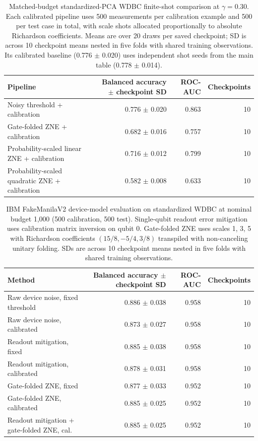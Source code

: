 \documentclass[conference]{IEEEtran}
\begin{document}
\begin{table}[t]\centering\small
\caption{Matched-budget standardized-PCA WDBC finite-shot comparison at $\gamma=0.30$. Each calibrated pipeline uses 500 measurements per calibration example and 500 per test case in total, with scale shots allocated proportionally to absolute Richardson coefficients. Means are over 20 draws per saved checkpoint; SD is across 10 checkpoint means nested in five folds with shared training observations. Its calibrated baseline (0.776 $\pm$ 0.020) uses independent shot seeds from the main table (0.778 $\pm$ 0.014).}
\label{tab:primary-gatefold}
\begin{tabular}{@{}l r r r@{}}\toprule
Pipeline & Balanced accuracy $\pm$ checkpoint SD & ROC-AUC & Checkpoints \\ \midrule
Noisy threshold + calibration & 0.776 $\pm$ 0.020 & 0.863 & 10 \\
Gate-folded ZNE + calibration & 0.682 $\pm$ 0.016 & 0.757 & 10 \\
Probability-scaled linear ZNE + calibration & 0.716 $\pm$ 0.012 & 0.799 & 10 \\
Probability-scaled quadratic ZNE + calibration & 0.582 $\pm$ 0.008 & 0.633 & 10 \\
\bottomrule\end{tabular}\end{table}

\begin{table}[t]\centering\small
\caption{IBM FakeManilaV2 device-model evaluation on standardized WDBC at nominal budget 1,000 (500 calibration, 500 test). Single-qubit readout error mitigation uses calibration matrix inversion on qubit 0. Gate-folded ZNE uses scales 1, 3, 5 with Richardson coefficients $(15/8, -5/4, 3/8)$ transpiled with non-canceling unitary folding. SDs are across 10 checkpoint means nested in five folds with shared training observations.}
\label{tab:fake-backend}
\begin{tabular}{@{}l r r r@{}}\toprule
Method & Balanced accuracy $\pm$ checkpoint SD & ROC-AUC & Checkpoints \\ \midrule
Raw device noise, fixed threshold & 0.886 $\pm$ 0.038 & 0.958 & 10 \\
Raw device noise, calibrated & 0.873 $\pm$ 0.027 & 0.958 & 10 \\
Readout mitigation, fixed & 0.885 $\pm$ 0.038 & 0.958 & 10 \\
Readout mitigation, calibrated & 0.878 $\pm$ 0.031 & 0.958 & 10 \\
Gate-folded ZNE, fixed & 0.877 $\pm$ 0.033 & 0.952 & 10 \\
Gate-folded ZNE, calibrated & 0.885 $\pm$ 0.025 & 0.952 & 10 \\
Readout mitigation + gate-folded ZNE, cal. & 0.885 $\pm$ 0.025 & 0.952 & 10 \\
\bottomrule\end{tabular}\end{table}
\end{document}
